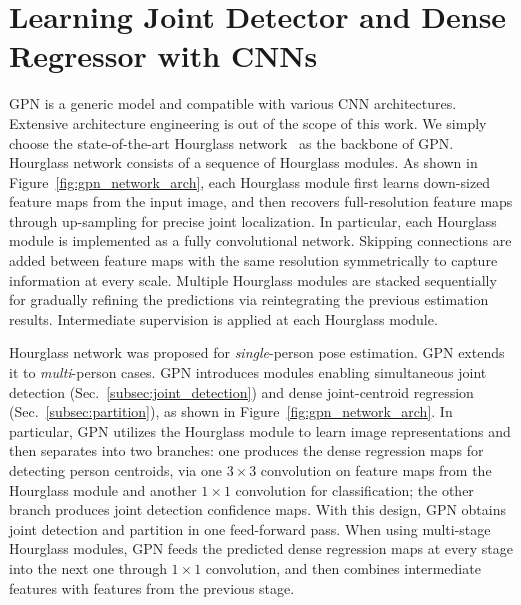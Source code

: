 \documentclass[10pt,twocolumn,letterpaper]{article}
\begin{document}
\section{Learning Joint Detector and Dense Regressor with CNNs}


GPN is a generic model and compatible with various CNN architectures. Extensive  architecture engineering is out of the scope of this work.  We simply choose the state-of-the-art Hourglass network~\cite{hpe:hourglass_arxiv15} as the backbone of GPN. Hourglass network consists of a sequence of Hourglass modules. As shown in Figure~\ref{fig:gpn_network_arch}, each Hourglass module first learns down-sized   feature maps from the input image, and then recovers full-resolution feature maps through up-sampling for precise joint localization. In particular, each Hourglass module is implemented as a fully convolutional network. Skipping connections are added between feature maps with the same resolution symmetrically to capture information at every scale. Multiple Hourglass modules are stacked sequentially for gradually refining the predictions via reintegrating the previous estimation results. Intermediate supervision is applied at each Hourglass module.


Hourglass network was  proposed for \emph{single}-person pose estimation. GPN extends it to \emph{multi}-person cases.  GPN introduces modules enabling simultaneous joint detection (Sec.~\ref{subsec:joint_detection})  and dense joint-centroid regression (Sec.~\ref{subsec:partition}), as shown in Figure~\ref{fig:gpn_network_arch}. In particular, GPN utilizes the Hourglass module to learn image  representations and then separates into two branches: one  produces the dense regression maps for detecting person centroids,   via one $3{\times}3$ convolution on feature maps from the Hourglass module and another  $1{\times}1$ convolution for classification; the other branch produces  joint detection confidence maps. With this design, GPN obtains joint detection and partition in one feed-forward pass. When using multi-stage Hourglass modules, GPN feeds the predicted dense regression maps  at every stage into the next one through $1{\times}1$ convolution, and then combines  intermediate features with  features from the previous stage.
\end{document}
